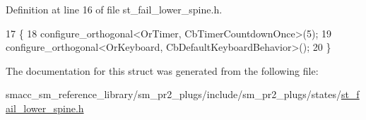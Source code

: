 Definition at line 16 of file st\+\_\+fail\+\_\+lower\+\_\+spine.\+h.


\begin{DoxyCode}
17     \{
18         configure\_orthogonal<OrTimer,  CbTimerCountdownOnce>(5);    
19         configure\_orthogonal<OrKeyboard, CbDefaultKeyboardBehavior>();
20     \}
\end{DoxyCode}


The documentation for this struct was generated from the following file\+:\begin{DoxyCompactItemize}
\item 
smacc\+\_\+sm\+\_\+reference\+\_\+library/sm\+\_\+pr2\+\_\+plugs/include/sm\+\_\+pr2\+\_\+plugs/states/\hyperlink{st__fail__lower__spine_8h}{st\+\_\+fail\+\_\+lower\+\_\+spine.\+h}\end{DoxyCompactItemize}
